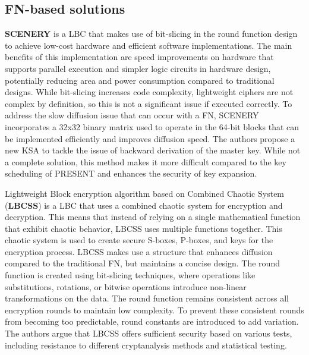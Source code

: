 \documentclass[conference]{IEEEtran}
\begin{document}
\subsection{FN-based solutions}

\textbf{SCENERY} is a LBC that makes use of bit-slicing in the round function design to achieve low-cost hardware and efficient software implementations. The main benefits of this implementation are speed improvements on hardware that supports parallel execution and simpler logic circuits in hardware design, potentially reducing area and power consumption compared to traditional designs. While bit-slicing increases code complexity, lightweight ciphers are not complex by definition, so this is not a significant issue if executed correctly. To address the slow diffusion issue that can occur with a FN, SCENERY incorporates a 32x32 binary matrix used to operate in the 64-bit blocks that can be implemented efficiently and improves diffusion speed. The authors propose a new KSA to tackle the issue of backward derivation of the master key. While not a complete solution, this method makes it more difficult compared to the key scheduling of PRESENT\cite{PRESENT} and enhances the security of key expansion\cite{SCENERY}.


Lightweight Block encryption algorithm based on Combined Chaotic System (\textbf{LBCSS}) is a LBC that uses a combined chaotic system for encryption and decryption. This means that instead of relying on a single mathematical function that exhibit chaotic behavior, LBCSS uses multiple functions together. This chaotic system is used to create secure S-boxes, P-boxes, and keys for the encryption process. LBCSS makes use a structure that enhances diffusion compared to the traditional FN, but maintains a concise design. The round function is created using bit-slicing techniques, where operations like substitutions, rotations, or bitwise operations introduce non-linear transformations on the data. The round function remains consistent across all encryption rounds to maintain low complexity. To prevent these consistent rounds from becoming too predictable, round constants are introduced to add variation. The authors argue that LBCSS offers sufficient security based on various tests, including resistance to different cryptanalysis methods and statistical testing\cite{LBCCS}.
\end{document}
